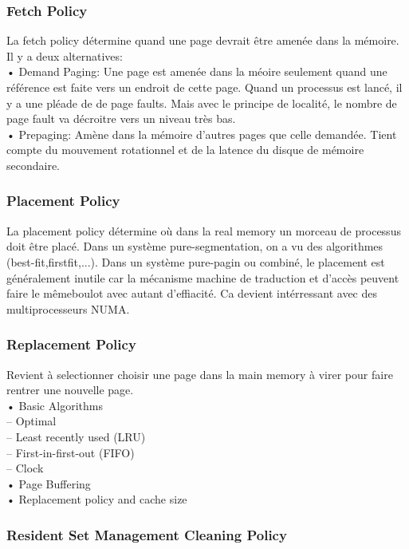 \subsubsection{Fetch Policy}
La fetch policy détermine quand une page devrait être amenée dans la mémoire.
Il y a deux alternatives:\\
• Demand Paging: Une page est amenée dans la méoire seulement quand une référence est faite vers un endroit de cette page.
Quand un processus est lancé, il y a une pléade de de page faults.
Mais avec le principe de localité, le nombre de page fault va décroitre vers un niveau très bas.\\
• Prepaging: Amène dans la mémoire d'autres pages que celle demandée.
Tient compte du mouvement rotationnel et de la latence du disque de mémoire secondaire.\\
\subsubsection{Placement Policy}
La placement policy détermine où dans la real memory un morceau de processus doit être placé.
Dans un système pure-segmentation, on a vu des algorithmes (best-fit,firstfit,...).
Dans un système pure-pagin ou combiné, le placement est généralement inutile car la mécanisme machine de traduction et d'accès peuvent faire le mêmeboulot avec autant d'effiacité.
Ca devient intérressant avec des multiprocesseurs NUMA.
\subsubsection{Replacement Policy}
Revient à selectionner choisir une page dans la main memory à virer pour faire rentrer une nouvelle page.\\
• Basic Algorithms\\
– Optimal\\
– Least recently used (LRU)\\
– First-in-first-out (FIFO) \\
– Clock\\
• Page Buffering\\
• Replacement policy and cache size
\subsubsection{Resident Set Management Cleaning Policy}
